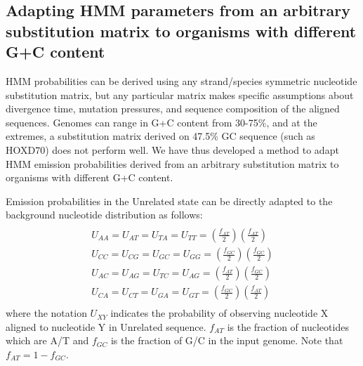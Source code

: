\documentclass[10pt,journal,letterpaper,compsoc,peerreview]{IEEEtran}
\begin{document}
\subsection{Adapting HMM parameters from an arbitrary substitution matrix to organisms with different G+C content}
HMM probabilities can be derived using any strand/species symmetric nucleotide substitution matrix,
but any particular matrix makes specific assumptions about divergence time, mutation pressures,
and sequence composition of the aligned sequences.
Genomes can range in G+C content from 30-75\%, and at the extremes,
a substitution matrix derived on 47.5\% GC sequence (such as HOXD70) does not
perform well.  We have thus developed a method to adapt HMM emission
probabilities derived from an arbitrary substitution matrix
to organisms with different G+C content.

Emission
probabilities in the Unrelated state can be directly adapted to the
background nucleotide distribution as follows:
\begin{multline}\\
U_{AA}=U_{AT}=U_{TA}=U_{TT}=(\frac{f_{AT}}{2})(\frac{f_{AT}}{2})\\
U_{CC}=U_{CG}=U_{GC}=U_{GG}=(\frac{f_{GC}}{2})(\frac{f_{GC}}{2})\\
U_{AC}=U_{AG}=U_{TC}=U_{AG}=(\frac{f_{AT}}{2})(\frac{f_{GC}}{2})\\
U_{CA}=U_{CT}=U_{GA}=U_{GT}=(\frac{f_{GC}}{2})(\frac{f_{AT}}{2})\\
\end{multline}
where the notation $U_{XY}$ indicates the probability of observing nucleotide X aligned to
nucleotide Y in Unrelated sequence.  $f_{AT}$ is the fraction of nucleotides which are A/T and
$f_{GC}$ is the fraction of G/C in the input genome.  Note that $f_{AT}=1-f_{GC}$.
\end{document}
